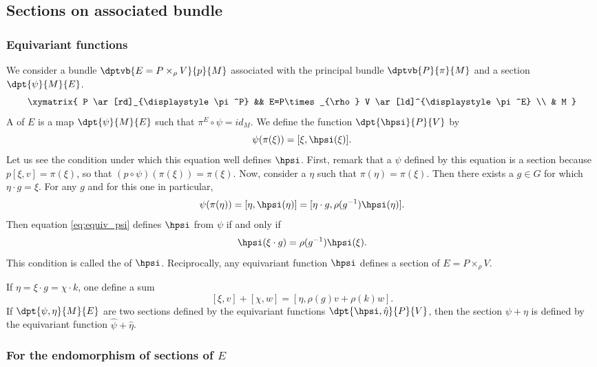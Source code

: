 \subsection{Sections on associated bundle}  \label{sec_fnequiv}

\subsubsection{Equivariant functions}

We consider a bundle $\dptvb{E=P\times_{\rho} V}{p}{M}$ associated with the principal bundle $\dptvb{P}{\pi}{M}$ and a section $\dpt{\psi}{M}{E}$. 
\[
 \xymatrix{ P \ar[rd]_{\displaystyle\pi^P} &&
 E=P\times_{\rho} V \ar[ld]^{\displaystyle\pi^E} \\ & M }
\]
A  of $E$ is a map $\dpt{\psi}{M}{E}$ such that $\pi^E\circ\psi=id_M$. We define the function $\dpt{\hpsi}{P}{V}$ by
\begin{equation}\label{eq:equiv_psi}
   \psi(\pi(\xi))=[\xi,\hpsi(\xi)].
\end{equation}
Let us see the condition under which this equation well defines $\hpsi$. First, remark that a $\psi$ defined by this equation is a section because $p[\xi,v]=\pi(\xi)$, so that $(p\circ\psi)(\pi(\xi))=\pi(\xi)$. Now, consider a $\eta$ such that $\pi(\eta)=\pi(\xi)$. Then there exists a $g\in G$ for which $\eta\cdot g=\xi$. For any $g$ and for this one in particular,
\[
  \psi(\pi(\eta))=[\eta,\hpsi(\eta)]=[\eta\cdot g,\rho(g^{-1})\hpsi(\eta)].
\]
Then equation \eqref{eq:equiv_psi} defines $\hpsi$ from $\psi$ if and only if 
\begin{equation}\label{eq:equiv_psi_b}
  \hpsi(\xi\cdot g)=\rho(g^{-1})\hpsi(\xi).
\end{equation}
This condition is called the  of $\hpsi$. Reciprocally, any equivariant function $\hpsi$ defines a section of $E=P\times_{\rho} V$.

If $\eta=\xi\cdot g=\chi\cdot k$, one define a sum
\begin{equation}\label{eq:def:som_E}
  [\xi,v]+[\chi,w]=[\eta,\rho(g)v+\rho(k)w].
\end{equation}
If $\dpt{\psi,\eta}{M}{E}$ are two sections defined by the equivariant functions $\dpt{\hpsi,\hat\eta}{P}{V}$, then the section $\psi+\eta$ is defined by the equivariant function $\hat\psi+\hat \eta$.

\subsubsection{For the endomorphism of sections of \texorpdfstring{$E$}{E}}\label{equivendo}

